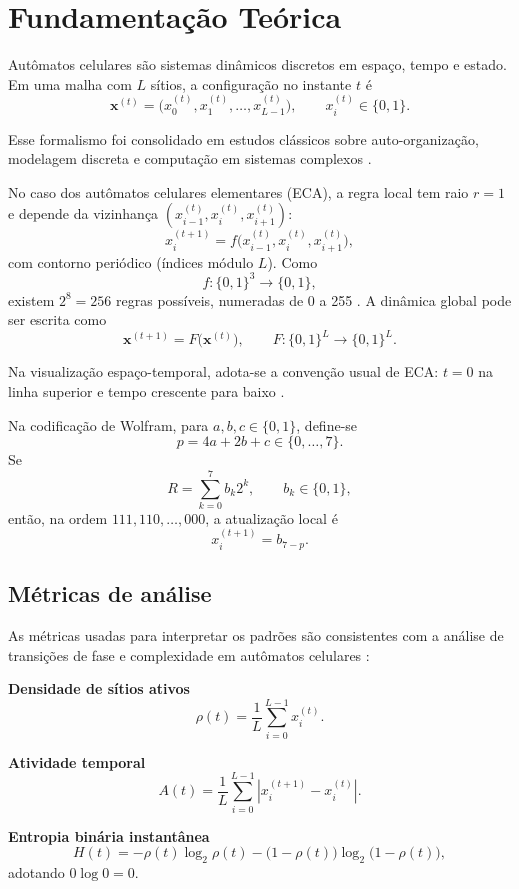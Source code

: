 \chapter{Fundamentação Teórica}
\label{chap_fundamentacao_teorica}

Autômatos celulares são sistemas dinâmicos discretos em espaço, tempo e estado. Em uma malha com \(L\) sítios, a configuração no instante \(t\) é
\[
\mathbf{x}^{(t)} = \big(x_0^{(t)},x_1^{(t)},\dots,x_{L-1}^{(t)}\big),
\qquad x_i^{(t)}\in\{0,1\}.
\]

Esse formalismo foi consolidado em estudos clássicos sobre auto-organização, modelagem discreta e computação em sistemas complexos \cite{vonneumann1966,toffoli1987,chopard1998,ilachinski2001}.

No caso dos autômatos celulares elementares (ECA), a regra local tem raio \(r=1\) e depende da vizinhança \((x_{i-1}^{(t)},x_i^{(t)},x_{i+1}^{(t)})\):
\[
x_i^{(t+1)} = f\big(x_{i-1}^{(t)},x_i^{(t)},x_{i+1}^{(t)}\big),
\]
com contorno periódico (índices módulo \(L\)). Como
\[
f:\{0,1\}^3\to\{0,1\},
\]
existem \(2^8=256\) regras possíveis, numeradas de 0 a 255 \cite{wolfram1983,wolfram2002,mathworldECA}. A dinâmica global pode ser escrita como
\[
\mathbf{x}^{(t+1)} = F\big(\mathbf{x}^{(t)}\big),
\qquad F:\{0,1\}^L\to\{0,1\}^L.
\]

Na visualização espaço-temporal, adota-se a convenção usual de ECA: \(t=0\) na linha superior e tempo crescente para baixo \cite{wikipediaECA,mathworldECA}.

Na codificação de Wolfram, para \(a,b,c\in\{0,1\}\), define-se
\[
p = 4a + 2b + c \in \{0,\dots,7\}.
\]
Se
\[
R = \sum_{k=0}^{7} b_k 2^k,
\qquad b_k\in\{0,1\},
\]
então, na ordem \(111,110,\dots,000\), a atualização local é
\[
x_i^{(t+1)} = b_{7-p}.
\]

\section{Métricas de análise}

As métricas usadas para interpretar os padrões são consistentes com a análise de transições de fase e complexidade em autômatos celulares \cite{langton1990,li1990,wolfram2002}:

\textbf{Densidade de sítios ativos}
\[
\rho(t)=\frac{1}{L}\sum_{i=0}^{L-1} x_i^{(t)}.
\]

\textbf{Atividade temporal}
\[
A(t)=\frac{1}{L}\sum_{i=0}^{L-1}\left|x_i^{(t+1)}-x_i^{(t)}\right|.
\]

\textbf{Entropia binária instantânea}
\[
H(t)=-\rho(t)\log_2\rho(t)-\big(1-\rho(t)\big)\log_2\big(1-\rho(t)\big),
\]
adotando \(0\log 0=0\).


